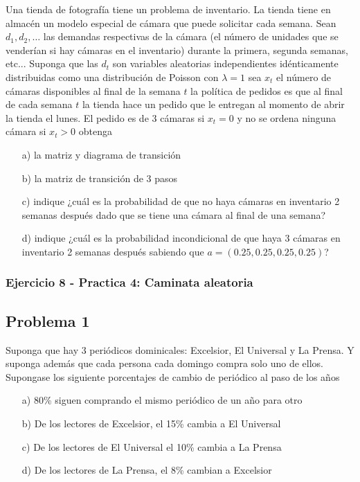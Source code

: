 \documentclass{article}
\begin{document}
Una tienda de fotografía tiene un problema de inventario. La tienda tiene en almacén un modelo especial de cámara que puede solicitar cada semana. Sean \( d_1, d_2, \ldots \) las demandas respectivas de la cámara (el número de unidades que se venderían si hay cámaras en el inventario) durante la primera, segunda semanas, etc... Suponga que las \( d_t \) son variables aleatorias independientes idénticamente distribuidas como una distribución de Poisson con \( \lambda = 1 \) sea \( x_t \) el número de cámaras disponibles al final de la semana \( t \) la política de pedidos es que al final de cada semana \( t \) la tienda hace un pedido que le entregan al momento de abrir la tienda el lunes. El pedido es de 3 cámaras si \( x_t = 0 \) y no se ordena ninguna cámara si \( x_t > 0 \) obtenga

\begin{itemize}
    \item[a)] la matriz y diagrama de transición
    \item[b)] la matriz de transición de 3 pasos
    \item[c)] indique ¿cuál es la probabilidad de que no haya cámaras en inventario 2 semanas después dado que se tiene una cámara al final de una semana?
    \item[d)] indique ¿cuál es la probabilidad incondicional de que haya 3 cámaras en inventario 2 semanas después sabiendo que \( a=(0.25, 0.25, 0.25, 0.25) \)?
\end{itemize}

\subsubsection{Ejercicio 8 - Practica 4: Caminata aleatoria}

\subsection*{Problema 1}

Suponga que hay 3 periódicos dominicales: Excelsior, El Universal y La Prensa.
Y suponga además que cada persona cada domingo compra solo uno de ellos. Supongase los siguiente porcentajes de cambio de periódico al paso de los años

\begin{itemize}
    \item[a)] 80\% siguen comprando el mismo periódico de un año para otro
    \item[b)] De los lectores de Excelsior, el 15\% cambia a El Universal
    \item[c)] De los lectores de El Universal el 10\% cambia a La Prensa
    \item[d)] De los lectores de La Prensa, el 8\% cambian a Excelsior
\end{itemize}
\end{document}
